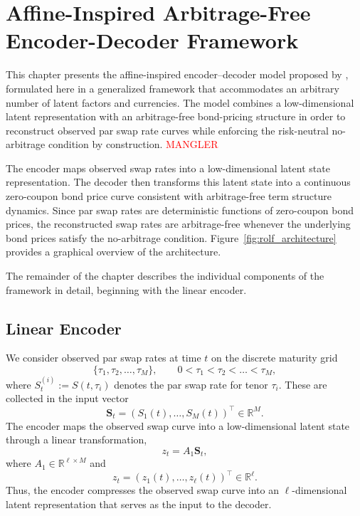 \chapter[Affine-Inspired Arbitrage-Free Encoder-Decoder Framework]
{Affine-Inspired Arbitrage-Free\\Encoder-Decoder Framework}
\label{chap:encoderdecodermodel}

This chapter presents the affine-inspired encoder--decoder model proposed by \citet{MatinWanPoulsen2025}, formulated here in a generalized framework that accommodates an arbitrary number of latent factors and currencies. The model combines a low-dimensional latent representation with an arbitrage-free bond-pricing structure in order to reconstruct observed par swap rate curves while enforcing the risk-neutral no-arbitrage condition by construction. \textcolor{red}{MANGLER}

The encoder maps observed swap rates into a low-dimensional latent state representation. The decoder then transforms this latent state into a continuous zero-coupon bond price curve consistent with arbitrage-free term structure dynamics. Since par swap rates are deterministic functions of zero-coupon bond prices, the reconstructed swap rates are arbitrage-free whenever the underlying bond prices satisfy the no-arbitrage condition. Figure~\ref{fig:rolf_architecture} provides a graphical overview of the architecture.



The remainder of the chapter describes the individual components of the framework in detail, beginning with the linear encoder.

\section{Linear Encoder}

We consider observed par swap rates at time $t$ on the discrete maturity grid
\[
\{\tau_1,\tau_2,\dots,\tau_M\}, \qquad 0<\tau_1<\tau_2<\dots<\tau_M,
\]
where $S_t^{(i)}:=S(t,\tau_i)$ denotes the par swap rate for tenor $\tau_i$. These are collected in the input vector
\[
\mathbf{S}_t=(S_1(t),\dots,S_M(t))^\top \in \mathbb{R}^M.
\]
The encoder maps the observed swap curve into a low-dimensional latent state through a linear transformation,
\[
z_t = A_1 \mathbf{S}_t,
\]
where $A_1 \in \mathbb{R}^{\ell \times M}$ and
\[
z_t=(z_1(t),\dots,z_\ell(t))^\top \in \mathbb{R}^\ell.
\]
Thus, the encoder compresses the observed swap curve into an $\ell$-dimensional latent representation that serves as the input to the decoder.




